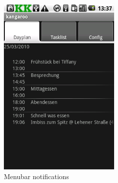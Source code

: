\begin{figure}[h!]
    \centering
    \includegraphics[width=6cm]{pics/gui/menubar_notification.png}
    \caption{Menubar notifications}
    \label{img:menubar_notifications}
\end{figure}
